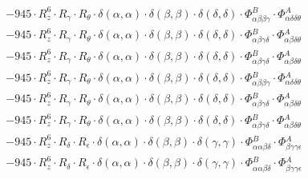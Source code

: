 \documentclass{article}
\begin{document}
\begin{subequations}
\begin{gather}
\begin{array}{c}
 \\[0.2em] 		 - 945 \cdot R_{z}^{6} \cdot R_{\gamma{}} \cdot R_{\theta{}} \cdot \delta{}\left(\alpha{}, \alpha{}\right) \cdot \delta{}\left(\beta{}, \beta{}\right) \cdot \delta{}\left(\delta{}, \delta{}\right) \cdot \Phi{}^{B}_{\alpha{}\beta{}\beta{}\gamma{}} \cdot \Phi{}^{A}_{\alpha{}\delta{}\delta{}\theta{}} 
 \\[0.2em] 		 - 945 \cdot R_{z}^{6} \cdot R_{\gamma{}} \cdot R_{\theta{}} \cdot \delta{}\left(\alpha{}, \alpha{}\right) \cdot \delta{}\left(\beta{}, \beta{}\right) \cdot \delta{}\left(\delta{}, \delta{}\right) \cdot \Phi{}^{B}_{\alpha{}\beta{}\gamma{}\delta{}} \cdot \Phi{}^{A}_{\alpha{}\beta{}\delta{}\theta{}} 
 \\[0.2em] 		 - 945 \cdot R_{z}^{6} \cdot R_{\gamma{}} \cdot R_{\theta{}} \cdot \delta{}\left(\alpha{}, \alpha{}\right) \cdot \delta{}\left(\beta{}, \beta{}\right) \cdot \delta{}\left(\delta{}, \delta{}\right) \cdot \Phi{}^{B}_{\alpha{}\beta{}\gamma{}\delta{}} \cdot \Phi{}^{A}_{\alpha{}\beta{}\delta{}\theta{}} 
 \\[0.2em] 		 - 945 \cdot R_{z}^{6} \cdot R_{\gamma{}} \cdot R_{\theta{}} \cdot \delta{}\left(\alpha{}, \alpha{}\right) \cdot \delta{}\left(\beta{}, \beta{}\right) \cdot \delta{}\left(\delta{}, \delta{}\right) \cdot \Phi{}^{B}_{\alpha{}\beta{}\beta{}\gamma{}} \cdot \Phi{}^{A}_{\alpha{}\delta{}\delta{}\theta{}} 
 \\[0.2em] 		 - 945 \cdot R_{z}^{6} \cdot R_{\gamma{}} \cdot R_{\theta{}} \cdot \delta{}\left(\alpha{}, \alpha{}\right) \cdot \delta{}\left(\beta{}, \beta{}\right) \cdot \delta{}\left(\delta{}, \delta{}\right) \cdot \Phi{}^{B}_{\alpha{}\beta{}\gamma{}\delta{}} \cdot \Phi{}^{A}_{\alpha{}\beta{}\delta{}\theta{}} 
 \\[0.2em] 		 - 945 \cdot R_{z}^{6} \cdot R_{\gamma{}} \cdot R_{\theta{}} \cdot \delta{}\left(\alpha{}, \alpha{}\right) \cdot \delta{}\left(\beta{}, \beta{}\right) \cdot \delta{}\left(\delta{}, \delta{}\right) \cdot \Phi{}^{B}_{\alpha{}\beta{}\gamma{}\delta{}} \cdot \Phi{}^{A}_{\alpha{}\beta{}\delta{}\theta{}} 
 \\[0.2em] 		 - 945 \cdot R_{z}^{6} \cdot R_{\delta{}} \cdot R_{\epsilon{}} \cdot \delta{}\left(\alpha{}, \alpha{}\right) \cdot \delta{}\left(\beta{}, \beta{}\right) \cdot \delta{}\left(\gamma{}, \gamma{}\right) \cdot \Phi{}^{B}_{\alpha{}\alpha{}\beta{}\delta{}} \cdot \Phi{}^{A}_{\beta{}\gamma{}\gamma{}\epsilon{}} 
 \\[0.2em] 		 - 945 \cdot R_{z}^{6} \cdot R_{\delta{}} \cdot R_{\epsilon{}} \cdot \delta{}\left(\alpha{}, \alpha{}\right) \cdot \delta{}\left(\beta{}, \beta{}\right) \cdot \delta{}\left(\gamma{}, \gamma{}\right) \cdot \Phi{}^{B}_{\alpha{}\alpha{}\beta{}\delta{}} \cdot \Phi{}^{A}_{\beta{}\gamma{}\gamma{}\epsilon{}} 

\end{array}
\end{gather}
\end{subequations}
\end{document}
